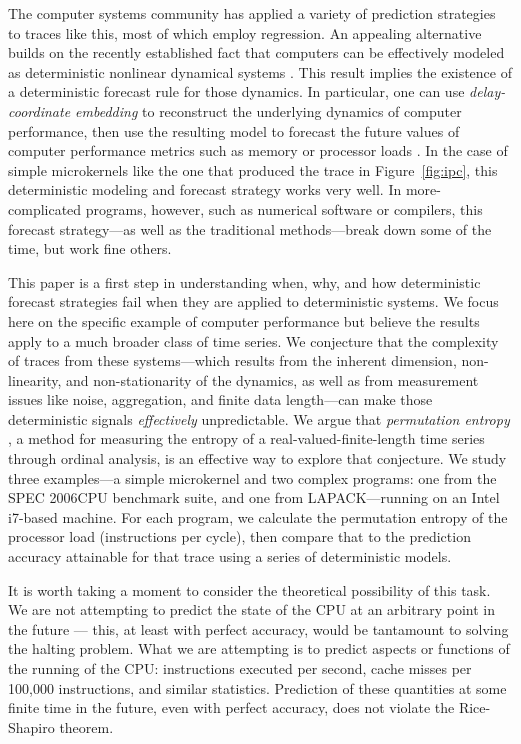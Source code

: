 The computer systems community has applied a variety of prediction
strategies to traces like this, most of which employ regression.  An
appealing alternative builds on the recently established fact that
computers can be effectively modeled as deterministic nonlinear
dynamical systems \cite{mytkowicz09}.  This result implies the
existence of a deterministic forecast rule for those dynamics.  In
particular, one can use \emph{delay-coordinate embedding} to
reconstruct the underlying dynamics of computer performance, then use
the resulting model to forecast the future values of computer
performance metrics such as memory or processor loads
\cite{josh-ida2011}.  In the case of simple microkernels like the one
that produced the trace in Figure~\ref{fig:ipc}, this deterministic
modeling and forecast strategy works very well.  In more-complicated
programs, however, such as numerical software or compilers,
this forecast strategy---as well as the traditional methods---break
down some of the time, but work fine others.

This paper is a first step in understanding when, why, and how
deterministic forecast strategies fail when they are applied to
deterministic systems.  We focus here on the specific example of
computer performance but believe the results apply to a much broader class of time series.  We conjecture that the complexity of traces
from these systems---which results from the inherent dimension,
non-linearity, and non-stationarity of the dynamics, as well as from
measurement issues like noise, aggregation, and finite data
length---can make those deterministic signals \emph{effectively}
unpredictable.  We argue that \emph{permutation entropy}
\cite{bandt2002per}, a method for measuring the entropy of a
real-valued-finite-length time series through ordinal analysis, is an
effective way to explore that conjecture.  We study three
examples---a simple microkernel and two complex programs: one from the
SPEC 2006CPU benchmark suite, and one from LAPACK---running on an Intel i7-based machine.  For
each program, we calculate the permutation entropy of the processor
load (instructions per cycle), then compare that to the prediction accuracy attainable for
that trace using a series of deterministic models.

It is worth taking a moment to consider the theoretical possibility of
this task. We are not attempting to predict the state of the CPU at an
arbitrary point in the future --- this, at least with perfect
accuracy, would be tantamount to solving the halting problem. What we
are attempting is to predict aspects or functions of the running of
the CPU: instructions executed per second, cache misses per 100,000
instructions, and similar statistics. Prediction of these quantities
at some finite time in the future, even with perfect accuracy, does
not violate the Rice-Shapiro theorem.

